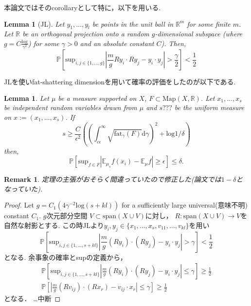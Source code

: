 \documentclass{ujarticle}
\newtheorem{lem}[thm]{Lemma}
\newtheorem*{rem}{Remark}
\begin{document}
本論文ではそのcorollaryとして特に，以下を用いる.
\begin{lem}[JL]
\label{JL}
  Let $y_1,\dots,y_l$ be points in the unit ball in $\mathbb{R}^m$ for some finite $m$.
Let $\mathbb{R}$ be an orthogonal projection onto a random $g$-dimensional subspace
(where $g = C \frac{\mathrm{log}}{\gamma^2}$) for some $\gamma > 0$ and an
absolute constant $C$). Then,
\begin{equation*}
\mathbb{P}[\mathrm{sup}_{i,j \in \{1,\dots,g\}} | \frac{m}{g}Ry_i\cdot Ry_j -y_i\cdot y_j| > \frac{ \gamma}{2}] < \frac{1}{2}
\end{equation*}
\end{lem}

JLを使いfat-shattering dimensionを用いて確率の評価をしたのが以下である.
\begin{lem}
\label{minifat}
  Let $\mu$ be a measure supported on $X$, $F \subset \mathrm{Map}(X,\mathbb{R})$.
  Let $x_1,\dots, x_s$ be independent random variables drawn from $\mu$
  and $s???$ be the uniform measure on $x := (x_1,\dots, x_s)$.
  If
\begin{equation*}
s \ge \frac{C}{\epsilon^2}(( \int_{c \epsilon}^{\infty}\sqrt{\mathrm{fat}_{\gamma}(F)}\mathrm{d}\gamma )^2 + \mathrm{log}1/\delta)
\end{equation*}
 then,
\begin{equation*}
 \mathbb{P}[ \mathrm{sup}_{f \in F} |\mathbb{E}_{\mu_s}f(x_i) -\mathbb{E}_{\mu}f|  \ge \epsilon] \le \delta.
\end{equation*}
\end{lem}
\begin{rem}
 定理の主張がおそらく間違っていたので修正した(論文では$1- \delta$となっていた).
\end{rem}
\begin{proof}
  Let $g= C_1(4\gamma^{-2} \mathrm{log}(s + kl))$
  for a sufficiently large universal(意味不明) constant $C_1$.
$g$次元部分空間 $V \subset \mathrm{span}(X \cup V) $に対し，
$ R : \mathrm{span}(X \cup V) \to V$を自然な射影とする.
  この時JLより$y_i,y_j \in \{ x_1 ,\dots ,x_s,v_11 ,\dots ,v_{kl} \}$を用い
  \begin{equation*}
   \mathbb{P} [\mathrm{sup}_{i,j \in \{ 1,\dots, s+kl\} } | \frac{m}{g}(Ry_i)\cdot (Ry_j) - y_i \cdot  y_j| > \gamma ] < \frac{1}{2}
 \end{equation*}
となる.
余事象の確率とsupの定義から，
\begin{eqnarray*}
  \mathbb{P} [\mathrm{sup}_{i,j \in \{ 1,\dots, s+kl\} } | \frac{m}{g}(Ry_i)\cdot (Ry_j) - y_i \cdot  y_j |\le  \gamma ] \ge \frac{1}{2} \\
    \mathbb{P} [ | \frac{m}{g}(Rv_{ij})\cdot (Rx_r) - v_{ij} \cdot  x_r | \le  \gamma ] \ge \frac{1}{2}
\end{eqnarray*}
となる．
…中断
\end{proof}
\end{document}
